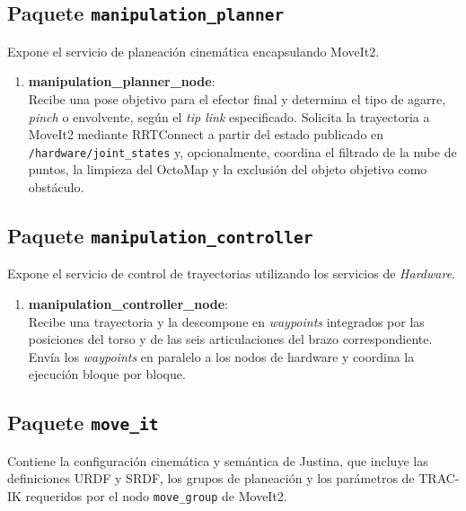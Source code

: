 \subsection{Paquete \texttt{manipulation\_planner}}
Expone el servicio de planeación cinemática encapsulando MoveIt2.

\begin{enumerate}
    \item \textbf{manipulation\_planner\_node}: \\
    Recibe una pose objetivo para el efector final y determina el tipo de agarre, \textit{pinch} o envolvente, según el \textit{tip link} especificado. Solicita la trayectoria a MoveIt2 mediante RRTConnect a partir del estado publicado en \texttt{/hardware/joint\_states} y, opcionalmente, coordina el filtrado de la nube de puntos, la limpieza del OctoMap y la exclusión del objeto objetivo como obstáculo.
\end{enumerate}

\subsection{Paquete \texttt{manipulation\_controller}}
Expone el servicio de control de trayectorias utilizando los servicios de \textit{Hardware}.

\begin{enumerate}
    \item \textbf{manipulation\_controller\_node}: \\
    Recibe una trayectoria y la descompone en \textit{waypoints} integrados por las posiciones del torso y de las seis articulaciones del brazo correspondiente. Envía los \textit{waypoints} en paralelo a los nodos de hardware y coordina la ejecución bloque por bloque.
\end{enumerate}

\subsection{Paquete \texttt{move\_it}}
Contiene la configuración cinemática y semántica de Justina, que incluye las definiciones URDF y SRDF, los grupos de planeación y los parámetros de TRAC-IK requeridos por el nodo \texttt{move\_group} de MoveIt2.

